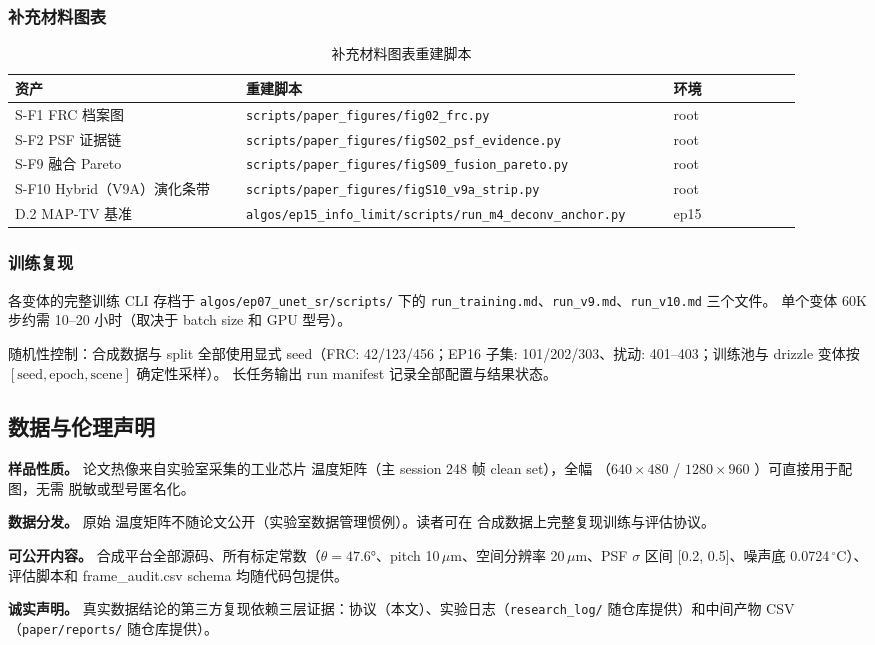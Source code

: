 \subsubsection{补充材料图表}

\begin{table}[ht]
  \centering
  \caption{补充材料图表重建脚本}
  \label{tab:supp-figs}
  \small
  \begin{tabular}{p{0.27\linewidth}p{0.50\linewidth}p{0.15\linewidth}}
    \toprule
    资产 & 重建脚本 & 环境 \\
    \midrule
    S-F1 FRC 档案图 & \texttt{scripts/paper\_figures/fig02\_frc.py} & root \\
    S-F2 PSF 证据链 & \texttt{scripts/paper\_figures/figS02\_psf\_evidence.py} & root \\
    S-F9 融合 Pareto & \texttt{scripts/paper\_figures/figS09\_fusion\_pareto.py} & root \\
    S-F10 Hybrid（V9A）演化条带 & \texttt{scripts/paper\_figures/figS10\_v9a\_strip.py} & root \\
    D.2 MAP-TV 基准 & \texttt{algos/ep15\_info\_limit/scripts/run\_m4\_deconv\_anchor.py} & ep15 \\
    \bottomrule
  \end{tabular}
\end{table}

\subsubsection{训练复现}

各变体的完整训练 CLI 存档于 \texttt{algos/ep07\_unet\_sr/scripts/} 下的
\texttt{run\_training.md}、\texttt{run\_v9.md}、\texttt{run\_v10.md} 三个文件。
单个变体 60K 步约需 10--20 小时（取决于 batch size 和 GPU 型号）。

随机性控制：合成数据与 split 全部使用显式 seed（FRC: 42/123/456；EP16 子集: 101/202/303、扰动: 401--403；训练池与 drizzle 变体按 \([\text{seed}, \text{epoch}, \text{scene}]\) 确定性采样）。
长任务输出 run manifest 记录全部配置与结果状态。

\subsection{数据与伦理声明}

\textbf{样品性质。} 论文热像来自实验室采集的工业芯片  温度矩阵（主 session 248 帧 clean set），全幅 （\(640 \times 480\)  / \(1280 \times 960\) ）可直接用于配图，无需  脱敏或型号匿名化。

\textbf{数据分发。} 原始  温度矩阵不随论文公开（实验室数据管理惯例）。读者可在  合成数据上完整复现训练与评估协议。

\textbf{可公开内容。}  合成平台全部源码、所有标定常数（\(\theta = 47.6°\)、pitch 10\,\(\mu\)m、空间分辨率 20\,\(\mu\)m、PSF \(\sigma\) 区间 [0.2, 0.5]、噪声底 0.0724\,\(^\circ\)C）、评估脚本和 frame\_audit.csv schema 均随代码包提供。

\textbf{诚实声明。} 真实数据结论的第三方复现依赖三层证据：协议（本文）、实验日志（\texttt{research\_log/} 随仓库提供）和中间产物 CSV（\texttt{paper/reports/} 随仓库提供）。
